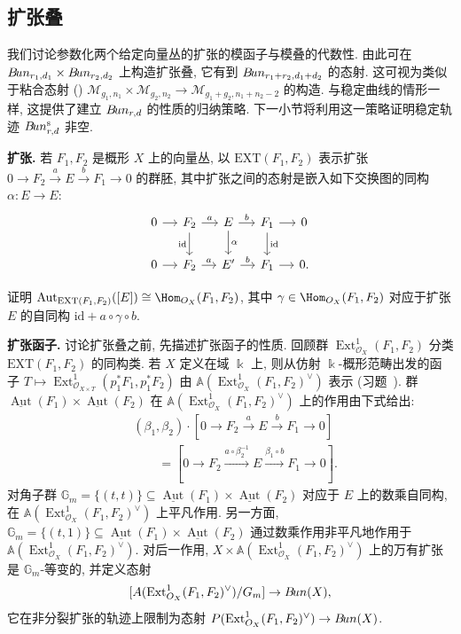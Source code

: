 \subsection{扩张叠}\label{src:9.2.4-subsection}
我们讨论参数化两个给定向量丛的扩张的模函子与模叠的代数性. 由此可在 $B\!un_{r_1,d_1}\times B\!un_{r_2,d_2}$ 上构造扩张叠, 它有到 $B\!un_{r_1+r_2,d_1+d_2}$ 的态射. 这可视为类似于粘合态射 () $\mathcal M_{g_1,n_1}\times\mathcal M_{g_2,n_2}\to\mathcal M_{g_1+g_2,n_1+n_2-2}$ 的构造. 与稳定曲线的情形一样, 这提供了建立 $B\!un_{r,d}$ 的性质的归纳策略. 下一小节将利用这一策略证明稳定轨迹 $B\!un_{r,d}^{\mathrm s}$ 非空.

\textbf{扩张.} 若 $F_1,F_2$ 是概形 $X$ 上的向量丛, 以 $\mathrm{EXT}(F_1,F_2)$ 表示扩张 $0\to F_2\xrightarrow aE\xrightarrow bF_1\to0$ 的群胚, 其中扩张之间的态射是嵌入如下交换图的同构 $\alpha:E\to E$:
\[
\begin{tikzcd}[ampersand replacement=\&,column sep=small]
0\arrow[r]\&F_2\arrow[r,"a"]\arrow[d,"\mathrm{id}"']\&E\arrow[r,"b"]\arrow[d,"\alpha"]\&F_1\arrow[r]\arrow[d,"\mathrm{id}"]\&0\\
0\arrow[r]\&F_2\arrow[r,"a"]\&E'\arrow[r,"b"]\&F_1\arrow[r]\&0.
\end{tikzcd}
\]
\begin{exercise}[简单]\label{src:9.2.10}
证明 $\operatorname{Aut}_{\mathrm{EXT}(F_1,F_2)}([E])\cong\Hom_{\mathcal O_X}(F_1,F_2)$, 其中 $\gamma\in\Hom_{\mathcal O_X}(F_1,F_2)$ 对应于扩张 $E$ 的自同构 $\mathrm{id}+a\circ\gamma\circ b$.
\end{exercise}
\textbf{扩张函子.} 讨论扩张叠之前, 先描述扩张函子的性质. 回顾群 $\operatorname{Ext}_{\mathcal O_X}^1(F_1,F_2)$ 分类 $\mathrm{EXT}(F_1,F_2)$ 的同构类. 若 $X$ 定义在域 $\Bbbk$ 上, 则从仿射 $\Bbbk$-概形范畴出发的函子 $T\mapsto\operatorname{Ext}_{\mathcal O_{X\times T}}^1(p_1^*F_1,p_1^*F_2)$ 由 $\mathbb A(\operatorname{Ext}_{\mathcal O_X}^1(F_1,F_2)^\vee)$ 表示 (习题~). 群 $\underline{\operatorname{Aut}}(F_1)\times\underline{\operatorname{Aut}}(F_2)$ 在 $\mathbb A(\operatorname{Ext}_{\mathcal O_X}^1(F_1,F_2)^\vee)$ 上的作用由下式给出:
\[
\begin{aligned}
&(\beta_1,\beta_2)\cdot[0\to F_2\xrightarrow aE\xrightarrow bF_1\to0]\\
&\qquad=[0\to F_2\xrightarrow{a\circ\beta_2^{-1}}E\xrightarrow{\beta_1\circ b}F_1\to0].
\end{aligned}
\]
对角子群 $\mathbb G_m=\{(t,t)\}\subseteq\underline{\operatorname{Aut}}(F_1)\times\underline{\operatorname{Aut}}(F_2)$ 对应于 $E$ 上的数乘自同构, 在 $\mathbb A(\operatorname{Ext}_{\mathcal O_X}^1(F_1,F_2)^\vee)$ 上平凡作用. 另一方面, $\mathbb G_m=\{(t,1)\}\subseteq\underline{\operatorname{Aut}}(F_1)\times\underline{\operatorname{Aut}}(F_2)$ 通过数乘作用非平凡地作用于 $\mathbb A(\operatorname{Ext}_{\mathcal O_X}^1(F_1,F_2)^\vee)$. 对后一作用, $X\times\mathbb A(\operatorname{Ext}_{\mathcal O_X}^1(F_1,F_2)^\vee)$ 上的万有扩张是 $\mathbb G_m$-等变的, 并定义态射
\begin{equation}\label{src:9.2.11}
[A(\operatorname{Ext}_{O_X}^1(F_1,F_2)^\vee)/G_m]\to B\!un(X),
\end{equation}
它在非分裂扩张的轨迹上限制为态射 $P(\operatorname{Ext}_{O_X}^1(F_1,F_2)^\vee)\to B\!un(X)$.

